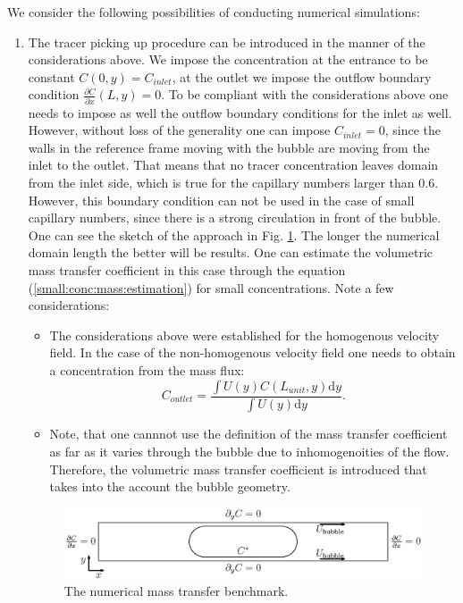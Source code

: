 \documentclass{article}
\newcommand{\beq}{\begin{equation}}
\newcommand{\feq}{\end{equation}}
\begin{document}
We consider the following possibilities of conducting numerical simulations:
\begin{enumerate}
 \item 
The tracer picking up procedure can be introduced
in the manner of the considerations above. We impose the concentration at the entrance to be
constant $C(0,y)=C_{inlet}$, at the outlet we impose the outflow boundary condition $\frac{\partial
C}{\partial x}(L,y)=0$. To be compliant with the considerations above one needs to impose as well
the outflow boundary conditions for the inlet as well. However, without loss of the generality one
can impose $C_{inlet}=0$, since the walls in the reference frame
moving with the bubble are moving from the inlet to the outlet. That means that no tracer
concentration leaves domain from the inlet side, which is true for the capillary numbers larger
than $0.6$.  However, this boundary condition can not be used in the case of small capillary
numbers, since there is a strong circulation in front of the bubble. One can see the sketch of the
approach in Fig. \ref{fig:benchmark:jos}. The longer the numerical domain length the better will be
results. One can estimate the volumetric mass transfer coefficient in this case through the equation
(\ref{small:conc:mass:estimation}) for small concentrations. Note a few considerations:
\begin{itemize}
\item  The considerations above were established for the homogenous velocity field. In the case of
the non-homogenous velocity field one needs to obtain a concentration from the mass flux:
\beq
C_{outlet}=\frac{\int{U(y) C(L_{unit},y) \mathrm{d}y}}{\int{U(y) \mathrm{d}y}}.
\feq
\item Note, that one cannnot use the definition of the mass transfer coefficient as far as it
varies through the bubble due to inhomogenoities of the flow. Therefore, the volumetric mass
transfer coefficient is introduced that takes into the account the bubble geometry.
\end{itemize}
\begin{figure}
\includegraphics[width=\textwidth]{Figures/benchmark_jos.eps}
\caption{The numerical mass transfer benchmark. \label{fig:benchmark:jos}}
\end{figure}


\end{enumerate}
\end{document}
